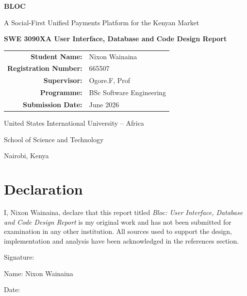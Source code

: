 \documentclass[12pt,a4paper]{article}
\begin{document}
\begin{titlepage}
    \centering
    \vspace*{1.0cm}
    {\Huge\bfseries BLOC\par}
    \vspace{0.35cm}
    {\Large A Social-First Unified Payments Platform for the Kenyan Market\par}
    \vspace{1.2cm}
    {\Large\bfseries SWE 3090XA User Interface, Database and Code Design Report\par}
    \vspace{1.4cm}

    \begin{tabular}{>{\bfseries}r l}
        Student Name: & Nixon Wainaina \\
        Registration Number: & 665507 \\
        Supervisor: & Ogore.F, Prof \\
        Programme: & BSc Software Engineering \\
        Submission Date: & June 2026 \\
    \end{tabular}

    \vfill
    {\large United States International University -- Africa\par}
    {\large School of Science and Technology\par}
    {\large Nairobi, Kenya\par}
\end{titlepage}


\section*{Declaration}
I, Nixon Wainaina, declare that this report titled \textit{Bloc: User Interface, Database and Code Design Report} is my original work and has not been submitted for examination in any other institution. All sources used to support the design, implementation and analysis have been acknowledged in the references section.

\vspace{1cm}
\noindent Signature:\hrulefill

\vspace{0.4cm}
\noindent Name: Nixon Wainaina

\vspace{0.4cm}
\noindent Date:\hrulefill
\end{document}
